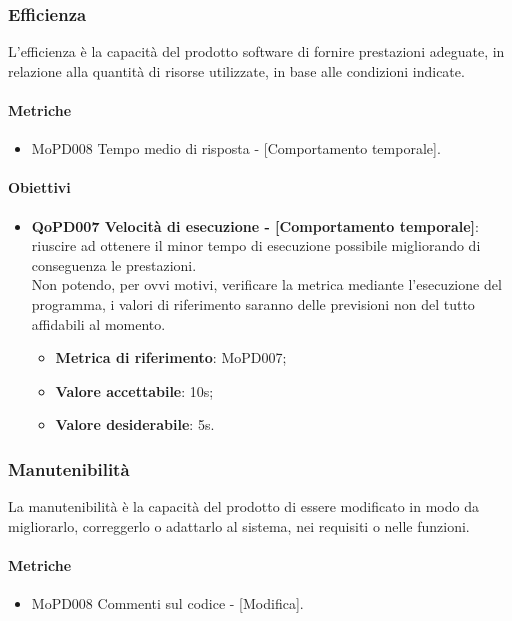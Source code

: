 \documentclass[../piano-di-qualifica.tex]{subfiles}
\begin{document}
\subsubsection{Efficienza}%
\label{sub:efficienza}
L'efficienza è la capacità del prodotto software di fornire prestazioni adeguate, in relazione alla quantità di
risorse utilizzate, in base alle condizioni indicate.

\paragraph{Metriche}
\label{sub:metriche}
\begin{itemize}
    \item MoPD008 Tempo medio di risposta - [Comportamento temporale].
\end{itemize}

\paragraph{Obiettivi}
\label{sub:obiettivi}
\begin{itemize}
    \item \textbf{QoPD007 Velocità di esecuzione - [Comportamento temporale]}: riuscire ad ottenere il minor tempo di esecuzione possibile migliorando di conseguenza le prestazioni.
    \\ Non potendo, per ovvi motivi, verificare la metrica mediante l'esecuzione del programma, i valori di riferimento saranno delle previsioni non del tutto affidabili al momento.
        \begin{itemize}
            \item \textbf{Metrica di riferimento}: MoPD007;
            \item \textbf{Valore accettabile}: 10s;
            \item \textbf{Valore desiderabile}: 5s.
        \end{itemize}
\end{itemize}

\subsubsection{Manutenibilità}%
\label{sub:manutenibilita}
La manutenibilità è la capacità del prodotto di essere modificato in modo da migliorarlo, correggerlo o adattarlo al sistema, nei requisiti o nelle funzioni.

\paragraph{Metriche}
\label{sub:metriche}
\begin{itemize}
    \item MoPD008 Commenti sul codice - [Modifica].
\end{itemize}
\end{document}
